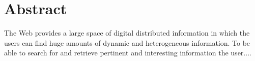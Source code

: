 \chapter*{Abstract}
The Web provides a large space of digital distributed information in
which the users can find huge amounts of dynamic and heterogeneous
information. To be able to search for and retrieve pertinent and
interesting information the user....

